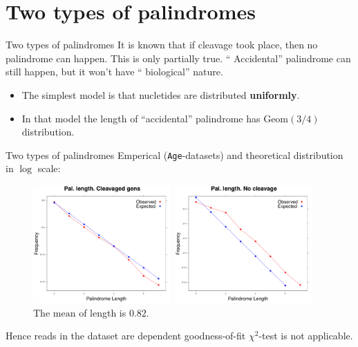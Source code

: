 \documentclass{beamer}\usepackage[]{graphicx}\usepackage[]{color}
\begin{document}
\section{Two types of palindromes}
\begin{frame}{Two types of palindromes}
  It is known that if cleavage took place, then no palindrome can happen. This is only partially true. 
  ``{\color{blue} Accidental}'' palindrome can still happen, but it won't have ``{\color{blue} biological}'' nature.
  
  \bigskip
  \begin{itemize}
    \item The simplest model is that nucletides are distributed \textbf{uniformly}.
    \item In that model the length of ``accidental'' palindrome has $\mathrm{Geom}(3/4)$ distribution.
  \end{itemize}
  
\end{frame}

\begin{frame}{Two types of palindromes}
 Emperical (\texttt{Age}-datasets) and theoretical distribution in $\log$ scale:
 \begin{figure}[h]
  \begin{minipage}[h]{0.49\linewidth}
    \center\includegraphics[width=150pt]{distr_pal_len_cl.pdf}
    \caption{\footnotesize{The $\mathrm{mean}$  of length is $0.33$.}}
  \end{minipage}
  \hfill
  \begin{minipage}[h]{0.49\linewidth}
   \includegraphics[width=150pt]{distr_pal_len_nocl.pdf}
   \caption{\footnotesize{The $\mathrm{mean}$ of length is $0.82$.}} 
  \end{minipage}
 \end{figure}
 
 \pause
 {\color{blue} Hence reads in the dataset are dependent goodness-of-fit $\chi^2$-test is not applicable. }
\end{frame}
\end{document}
